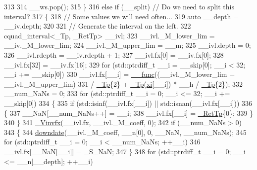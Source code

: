 \begin{DoxyCode}
313 
314               \_\_ws.pop();
315             \}
316           \textcolor{keywordflow}{else} \textcolor{keywordflow}{if} (\_\_split) \textcolor{comment}{// Do we need to split this interval?}
317             \{
318               \textcolor{comment}{// Some values we will need often...}
319               \textcolor{keyword}{auto} \_\_depth = \_\_iv.depth;
320 
321               \textcolor{comment}{// Generate the interval on the left.}
322               cquad\_interval<\_Tp, \_RetTp> \_\_ivl;
323               \_\_ivl.\_M\_lower\_lim = \_\_iv.\_M\_lower\_lim;
324               \_\_ivl.\_M\_upper\_lim = \_\_m;
325               \_\_ivl.depth = 0;
326               \_\_ivl.rdepth = \_\_iv.rdepth + 1;
327               \_\_ivl.fx[0] = \_\_iv.fx[0];
328               \_\_ivl.fx[32] = \_\_iv.fx[16];
329               \textcolor{keywordflow}{for} (std::ptrdiff\_t \_\_i = \_\_skip[0]; \_\_i < 32; \_\_i += \_\_skip[0])
330                 \_\_ivl.fx[\_\_i] = \hyperlink{namespace____gnu__cxx_af2b2f0c7a2ae72b922b1afefae5a65b2}{\_\_func}((\_\_ivl.\_M\_lower\_lim + \_\_ivl.\_M\_upper\_lim)
331                               / \hyperlink{namespace____gnu__cxx_a3b19a9c800ca194374ef9172290f7d79}{\_Tp}\{2\} + \hyperlink{namespace____gnu__cxx_a3b19a9c800ca194374ef9172290f7d79}{\_Tp}(\hyperlink{namespace____gnu__cxx_a8a912ee89c90a7e5049ce5ffad04274b}{xi}[\_\_i]) * \_\_h / \hyperlink{namespace____gnu__cxx_a3b19a9c800ca194374ef9172290f7d79}{\_Tp}\{2\});
332               \_\_num\_NaNs = 0;
333               \textcolor{keywordflow}{for} (std::ptrdiff\_t \_\_i = 0; \_\_i <= 32; \_\_i += \_\_skip[0])
334                 \{
335                   \textcolor{keywordflow}{if} (std::isinf(\_\_ivl.fx[\_\_i]) || std::isnan(\_\_ivl.fx[\_\_i]))
336                     \{
337                       \_\_NaN[\_\_num\_NaNs++] = \_\_i;
338                       \_\_ivl.fx[\_\_i] = \hyperlink{namespace____gnu__cxx_a886e03ece3d53ff7fa6c098a40f93fa5}{\_RetTp}\{0\};
339                     \}
340                 \}
341               \hyperlink{namespace____gnu__cxx_a6215f0335d2b6f478726299660ccca4e}{\_Vinvfx}(\_\_ivl.fx, \_\_ivl.\_M\_coeff, 0);
342               \textcolor{keywordflow}{if} (\_\_num\_NaNs > 0)
343                 \{
344                   \hyperlink{namespace____gnu__cxx_a3a0de8d324d776aa6b7f631559da4d7c}{downdate}(\_\_ivl.\_M\_coeff, \_\_n[0], 0, \_\_NaN, \_\_num\_NaNs);
345                   \textcolor{keywordflow}{for} (std::ptrdiff\_t \_\_i = 0; \_\_i < \_\_num\_NaNs; ++\_\_i)
346                     \_\_ivl.fx[\_\_NaN[\_\_i]] = \_S\_NaN;
347                 \}
348               \textcolor{keywordflow}{for} (std::ptrdiff\_t \_\_i = 0; \_\_i <= \_\_n[\_\_depth]; ++\_\_i)

\end{DoxyCode}

